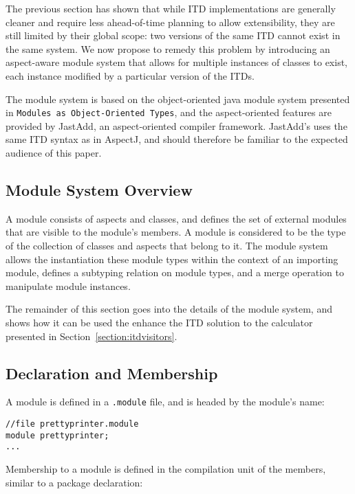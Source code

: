 The previous section has shown that while ITD implementations are generally
cleaner and require less ahead-of-time planning to allow extensibility, they
are still limited by their global scope: two versions of the same ITD cannot
exist in the same system. We now propose to remedy this problem by introducing
an aspect-aware module system that allows for multiple instances of classes
to exist, each instance modified by a particular version of the ITDs.

The module system is based on the object-oriented java module system 
presented in \texttt{Modules as Object-Oriented Types}\cite{modulesastypes},
and the aspect-oriented features are provided by Jast\-Add\cite{jastadd, jastaddjavacompiler}, 
an aspect-oriented compiler framework. Jast\-Add's uses the same ITD 
syntax as in AspectJ, and should therefore be familiar to the expected audience
of this paper.

\subsection{Module System Overview}

A module consists of aspects and classes, and defines the set of external
modules that are visible to the module's members. 
A module is considered to be the type of the collection of classes and aspects
that belong to it. The module system allows the instantiation these module types
within the context of an importing module, defines a subtyping relation
on module types, and a merge operation to manipulate module instances.

The remainder of this section goes into the details of the module system, and shows
how it can be used the enhance the ITD solution to the calculator 
presented in Section~\ref{section:itdvisitors}.

\subsection{Declaration and Membership}

A module is defined in a \texttt{.module} file, and is headed by the module's name:

\begin{lstlisting}[caption={Module Declaration}]
//file prettyprinter.module
module prettyprinter;
...
\end{lstlisting}

Membership to a module is defined in the compilation unit of the members,
similar to a package declaration:

